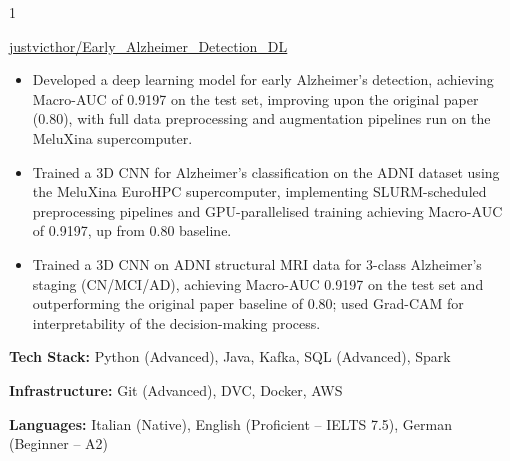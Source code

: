 \documentclass[10pt,a4paper,ragged2e,withhyper]{cv}
\begin{document}
\begin{paracol}{1}
\begin{itemize}
\end{itemize}

\medskip

 {}
{
}
{\href{https://github.com/justvicthor/Early_Alzheimer_Detection_DL}
{justvicthor/Early\_Alzheimer\_Detection\_DL}}
\begin{itemize}

\ifde
    \item Developed a deep learning model for early Alzheimer's detection, achieving Macro-AUC of 0.9197 on the test set, improving upon the original paper (0.80), with full data preprocessing and augmentation pipelines run on the MeluXina supercomputer.
\else
    \ifhpc
        \item Trained a 3D CNN for Alzheimer's classification on the ADNI dataset using the MeluXina EuroHPC supercomputer, implementing SLURM-scheduled preprocessing pipelines and GPU-parallelised training achieving Macro-AUC of 0.9197, up from 0.80 baseline.
    \else
        \item Trained a 3D CNN on ADNI structural MRI data for 3-class Alzheimer's staging (CN/MCI/AD), achieving Macro-AUC 0.9197 on the test set and outperforming the original paper baseline of 0.80; used Grad-CAM for interpretability of the decision-making process.
    \fi
\fi

\end{itemize}

\medskip



\textbf{Tech Stack:} {\small Python (Advanced), Java, Kafka, SQL (Advanced), Spark}

\textbf{Infrastructure:} {\small Git (Advanced), DVC, Docker, AWS}

\textbf{Languages:} {\small Italian (Native), English (Proficient -- IELTS 7.5), German (Beginner -- A2)}


\end{paracol}
\end{document}
